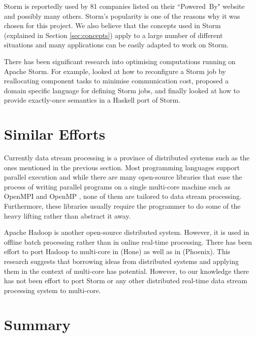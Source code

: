 \documentclass[bsc,deptreport,twoside,singlespacing,normalheadings,parskip]{infthesis}\usepackage[]{graphicx}\usepackage[]{color}
\begin{document}
Storm is reportedly used by 81 companies listed on their ``Powered~By" website \cite{PoweredBy} and possibly many others. Storm's popularity is one of the reasons why it was chosen for this project. We also believe that the concepts used in Storm (explained in Section \ref{sec:concepts}) apply to a large number of different situations and many applications can be easily adapted to work on Storm.

There has been significant research into optimising computations running on Apache Storm. For example, \cite{Chatzistergiou:2014:FHN:2661829.2661882} looked at how to reconfigure a Storm job by reallocating component tasks to minimise communication cost, \cite{DBLP:conf/fedcsis/ChandrasekaranSA14} proposed a domain specific language for defining Storm jobs, and finally \cite{dimsonhailstorm} looked at how to provide exactly-once semantics in a Haskell port of Storm.

\section{Similar Efforts}
\label{sec:similar_efforts}

Currently data stream processing is a province of distributed systems such as the ones mentioned in the previous section. Most programming languages support parallel execution and while there are many open-source libraries that ease the process of writing parallel programs on a single multi-core machine such as OpenMPI \cite{OpenMPI} and OpenMP \cite{OpenMP} , none of them are tailored to data stream processing. Furthermore, these libraries usually require the programmer to do some of the heavy lifting rather than abstract it away.

Apache Hadoop is another open-source distributed system. However, it is used in offline batch processing rather than in online real-time processing. There has been effort to port Hadoop to multi-core in \citep{Kumar:2013:HSD:2536274.2536314} (Hone) as well as in \citep{ranger2007evaluating} (Phoenix). This research suggests that borrowing ideas from distributed systems and applying them in the context of multi-core has potential. However, to our knowledge there has not been effort to port Storm or any other distributed real-time data stream processing system to multi-core.

\section{Summary}
\end{document}
